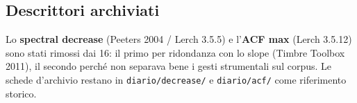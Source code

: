 \documentclass[a4paper,11pt]{article}
\begin{document}
\subsection{Descrittori archiviati}
Lo \textbf{spectral decrease} (Peeters 2004 / Lerch 3.5.5) e l'\textbf{ACF
max} (Lerch 3.5.12) sono stati rimossi dai 16: il primo per ridondanza
con lo slope (Timbre Toolbox 2011), il secondo perché non separava
bene i gesti strumentali sul corpus. Le schede d'archivio restano in
\texttt{diario/decrease/} e \texttt{diario/acf/} come riferimento storico.
\end{document}
